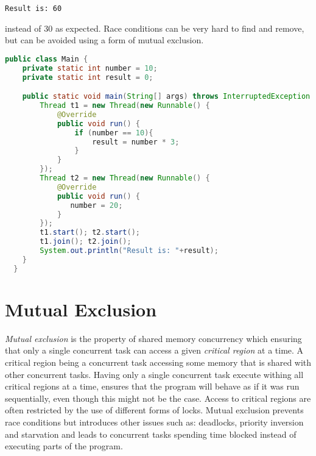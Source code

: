 \begin{verbatim}
Result is: 60
\end{verbatim}
instead of 30 as expected. Race conditions can be very hard to find and remove, but can be avoided using a form of mutual exclusion.
\begin{lstlisting}[float,label=lst:racecondition,
  caption={Race condition example},
  language=Java,  
  showspaces=false,
  showtabs=false,
  breaklines=true,
  showstringspaces=false,
  breakatwhitespace=true,
  commentstyle=\color{greencomments},
  keywordstyle=\color{bluekeywords},
  stringstyle=\color{redstrings}]  % Start your code-block
public class Main {
    private static int number = 10;
    private static int result = 0;

    public static void main(String[] args) throws InterruptedException {
        Thread t1 = new Thread(new Runnable() {
            @Override
            public void run() {
                if (number == 10){
                    result = number * 3;
                }
            }
        });
        Thread t2 = new Thread(new Runnable() {
            @Override
            public void run() {
               number = 20;
            }
        });
        t1.start(); t2.start();
        t1.join(); t2.join();
        System.out.println("Result is: "+result);
    }
  }
\end{lstlisting}

\section{Mutual Exclusion}
\emph{Mutual exclusion} is the property of shared memory concurrency which ensuring that only a single concurrent task can access a given \emph{critical region} at a time\cite[p. 117]{tanenbaum2008modern}\cite[p. 962]{bryant2011computer}. A critical region being a concurrent task accessing some memory that is shared with other concurrent tasks\cite[p. 117]{tanenbaum2008modern}\cite[p. 961]{bryant2011computer}. Having only a single concurrent task execute withing all critical regions at a time, ensures that the program will behave as if it was run sequentially, even though this might not be the case. Access to critical regions are often restricted by the use of different forms of locks. Mutual exclusion prevents race conditions but introduces other issues such as: deadlocks, priority inversion and starvation and leads to concurrent tasks spending time blocked instead of executing parts of the program.

